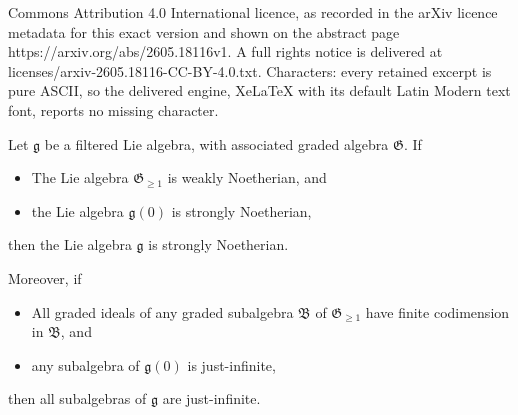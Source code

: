\documentclass[10pt,a4paper]{amsart}
\newcommand{\G}{\mathfrak G}
\newcommand{\fB}{\mathfrak{B}}
\newcommand{\fG}{\mathfrak{G}}
\newcommand{\fg}{\mathfrak{g}}
\newcommand{\g}{\mathfrak g}
\begin{document}
Commons Attribution 4.0 International licence, as recorded in the arXiv licence metadata for this exact version and shown on the abstract page https://arxiv.org/abs/2605.18116v1. A full rights notice is delivered at licenses/arxiv-2605.18116-CC-BY-4.0.txt. Characters: every retained excerpt is pure ASCII, so the delivered engine, XeLaTeX with its default Latin Modern text font, reports no missing character.
\begin{lemma}\label{Noeth-just}
 Let $\g$ be a filtered Lie algebra, with associated graded algebra $\fG$. If

 \begin{itemize}
\item[(a1)]The Lie algebra $\fG_{\geq 1}$
is weakly Noetherian, and

\item[(a2)] the Lie algebra 
$\fg(0)$ is strongly Noetherian,
\end{itemize}

\noindent then the Lie algebra $\g$ is strongly  Noetherian.

\medbreak
Moreover, if 

 \begin{itemize}
\item[(b1)] All  graded ideals   of any graded subalgebra $\fB$ of $\G_{\geq 1}$ have 
finite codimension in $\fB$, and

\item[(b2)] any subalgebra of  $\fg(0)$ is just-infinite,
\end{itemize}

\noindent then all subalgebras of $\g$ are  just-infinite.
\end{lemma}
\end{document}
